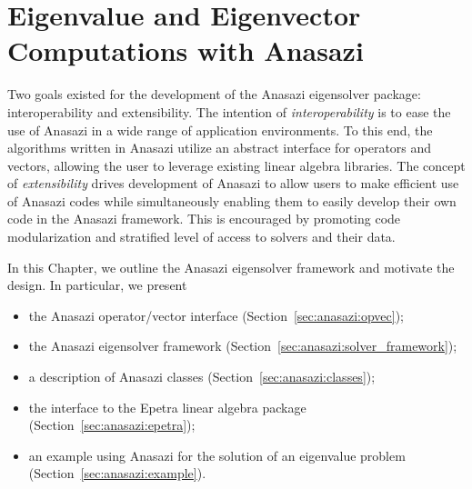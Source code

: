 % 
% 
% 
%   
%   
% 
% 

\chapter{Eigenvalue and Eigenvector Computations with Anasazi}
\label{chap:anasazi}


\begin{introchapter}
Two goals existed for the development of the Anasazi eigensolver package: interoperability
and extensibility. The intention of \emph{interoperability} is to ease the use of Anasazi
in a wide range of application environments. To this end, the algorithms written in Anasazi utilize an
abstract interface for operators and vectors, allowing the user to leverage existing
linear algebra libraries. The concept of \emph{extensibility} drives 
development of Anasazi to allow users to make efficient use of Anasazi codes while
simultaneously enabling them to easily develop their own code in the Anasazi framework.
This is encouraged by promoting code modularization and stratified level of access to
solvers and their data.

In this Chapter, we outline the Anasazi eigensolver framework and motivate the design.
In particular, we present
\begin{itemize}
  \item the Anasazi operator/vector interface (Section~\ref{sec:anasazi:opvec});
  \item the Anasazi eigensolver framework (Section~\ref{sec:anasazi:solver_framework});
  \item a description of Anasazi classes (Section~\ref{sec:anasazi:classes});
  \item the interface to the Epetra linear algebra package (Section~\ref{sec:anasazi:epetra});
  \item an example using Anasazi for the solution of an eigenvalue problem (Section~\ref{sec:anasazi:example}).
\end{itemize}
\end{introchapter}

